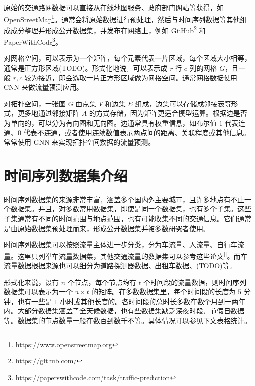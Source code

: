 \documentclass{ctexart}
\renewcommand{\cite}[1]{\textsuperscript{[\citenum{#1}]}}
\begin{document}
原始的交通路网数据可以直接从在线地图服务、政府部门网站等获得，如 OpenStreetMap\footnote{\url{https://www.openstreetmap.org}}。通常会将原始数据进行预处理，然后与时间序列数据等其他组成成分整理并形成公开数据集，并发布在网络上，例如 GitHub\footnote{\url{https://github.com/}} 和 PaperWithCode\footnote{\url{https://paperswithcode.com/task/traffic-prediction}}。

对网格空间，可以表示为一个矩阵，每个元素代表一片区域，每个区域大小相等，通常是正方形区域(TODO)。形式化地说，可以表示成 $r$ 行 $c$ 列的网格 $G$，且一般 $r,c$ 较为接近，即会选取一片正方形区域做为网格空间。通常网格数据使用 CNN 来做流量预测应用。

对拓扑空间，一张图 $G$ 由点集 $V$ 和边集 $E$ 组成，边集可以存储成邻接表等形式，更多地通过邻接矩阵 $A$ 的方式存储，因为矩阵更适合模型运算。根据边是否为单向的，可以分为有向图和无向图。边通常具有权重信息，如布尔值 $1$ 代表连通、$0$ 代表不连通，或者使用连续数值表示两点间的距离、关联程度或其他信息。常常使用 GNN 来实现拓扑空间数据的流量预测。%

\section{时间序列数据集介绍}
时间序列数据集的来源非常丰富，涵盖多个国内外主要城市，且许多地点有不止一个数据集。并且，对多数常用数据集，即使是同一个数据集，也有多个子集。这些子集通常有不同的时间范围与地点范围，也有可能收集不同的交通信息。它们通常是由原始数据集预处理而来，形成公开数据集并被多数研究者使用。

时间序列数据集可以按照流量主体进一步分类，分为车流量、人流量、自行车流量。这里只列举车流量数据集，其他交通流量的数据集可以参考这些论文\cite{T-ZS1, T-ZS2, T-ZS29}。而车流量数据根据来源也可以细分为道路探测器数据、出租车数据、(TODO)等。

形式化来说，设有 $n$ 个节点，每个节点均有 $t$ 个时间段的流量数据，则时间序列数据集可以表示为一个 $n \times t$ 的矩阵。在多数数据集里，每个时间段的长度为 $5$ 分钟，也有一些是 $1$ 小时或其他长度的。各时间段的总时长多数在数个月到一两年内。大部分数据集涵盖了全天候数据，也有些数据集缺乏深夜时段、节假日数据等。数据集的节点数量一般在数百到数千不等。具体情况可以参见下文表格统计。
\end{document}
